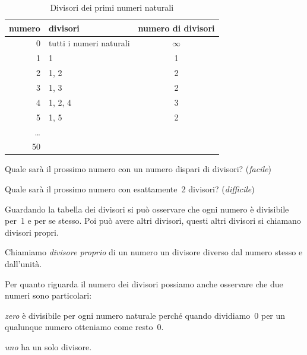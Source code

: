 \begin{table}[h]
\centering
\caption{Divisori dei primi numeri naturali}
\begin{tabular}{|r|p{6cm}|c|}
\hline
\textsf{\relax 
numero
} & \textsf{\relax 
          divisori          
} & \textsf{\relax 
numero di divisori
}\\
\hline
0 & tutti i numeri naturali & \(\infty\)\\
\hline
1 & 1 & 1\\
\hline
2 & 1, 2 & 2\\
\hline
3 & 1, 3 & 2\\
\hline
4 & 1, 2, 4 & 3\\
\hline
5 & 1, 5 & 2\\
\hline
\dots &  & \\
\hline
50 &  & \\
\hline
\end{tabular}
\end{table}

\begin{enumeratea}
 \item Quale sarà il prossimo numero con un numero dispari 
  di divisori? (\emph{facile})
 \item Quale sarà il prossimo numero con esattamente~2
  divisori? (\emph{difficile})
\end{enumeratea}

Guardando la tabella dei divisori si può osservare che ogni numero è 
divisibile per~1 e per se stesso. Poi può avere altri divisori, questi
altri divisori si chiamano divisori propri.

\begin{definizione}
 Chiamiamo \emph{divisore proprio} di un numero un divisore diverso dal 
 numero stesso e dall'unità.
\end{definizione}

Per quanto riguarda il numero dei divisori possiamo anche osservare che 
due numeri sono particolari:

\begin{itemize*}
 \item \emph{zero} è divisibile per ogni numero naturale perché quando 
  dividiamo~0 per un qualunque numero otteniamo come resto~0.
 \item \emph{uno} ha un solo divisore.
\end{itemize*}

